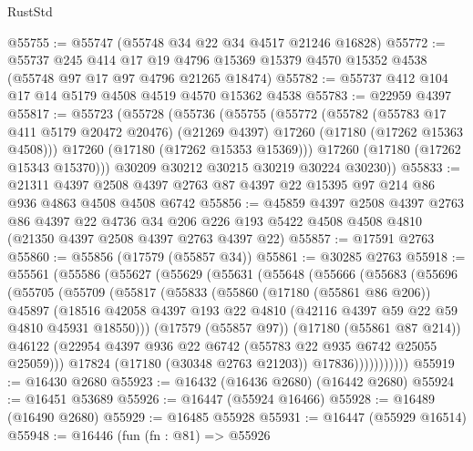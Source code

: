 \begin{lexlean}{RustStd}
\begin{coremodule}
{\begin{coremodule}
{{{{{{{{{{{{{{{{{{{{{{{{{{{{{{{{{{{{{{{{{{{{{{{{{{{{{{{@55755 := @55747 (@55748 @34 @22 @34 @4517 @21246 @16828)
@55772 := @55737
    @245
    @414
    @17
    @19
    @4796
    @15369
    @15379
    @4570
    @15352
    @4538
    (@55748 @97 @17 @97 @4796 @21265 @18474)
@55782 := @55737 @412 @104 @17 @14 @5179 @4508 @4519 @4570 @15362 @4538
@55783 := @22959 @4397
@55817 := @55723
    (@55728
      (@55736
        (@55755
          (@55772
            (@55782
              (@55783 @17 @411 @5179 @20472 @20476)
              (@21269 @4397)
              @17260
              (@17180 (@17262 @15363 @4508)))
            @17260
            (@17180 (@17262 @15353 @15369)))
          @17260
          (@17180 (@17262 @15343 @15370)))
        @30209
        @30212
        @30215
        @30219
        @30224
        @30230))
@55833 := @21311
    @4397
    @2508
    @4397
    @2763
    @87
    @4397
    @22
    @15395
    @97
    @214
    @86
    @936
    @4863
    @4508
    @4508
    @6742
@55856 := @45859
    @4397
    @2508
    @4397
    @2763
    @86
    @4397
    @22
    @4736
    @34
    @206
    @226
    @193
    @5422
    @4508
    @4508
    @4810
    (@21350 @4397 @2508 @4397 @2763 @4397 @22)
@55857 := @17591 @2763
@55860 := @55856 (@17579 (@55857 @34))
@55861 := @30285 @2763
@55918 := @55561
    (@55586
      (@55627
        (@55629
          (@55631
            (@55648
              (@55666
                (@55683
                  (@55696
                    (@55705
                      (@55709
                        (@55817
                          (@55833
                            (@55860
                              (@17180 (@55861 @86 @206))
                              @45897
                              (@18516
                                @42058
                                @4397
                                @193
                                @22
                                @4810
                                (@42116 @4397 @59 @22 @59 @4810 @45931 @18550)))
                            (@17579 (@55857 @97))
                            (@17180 (@55861 @87 @214))
                            @46122
                            (@22954 @4397 @936 @22 @6742 (@55783 @22 @935 @6742 @25055 @25059)))
                          @17824
                          (@17180 (@30348 @2763 @21203))
                          @17836)))))))))))
@55919 := @16430 @2680
@55923 := @16432 (@16436 @2680) (@16442 @2680)
@55924 := @16451 @53689
@55926 := @16447 (@55924 @16466)
@55928 := @16489 (@16490 @2680)
@55929 := @16485 @55928
@55931 := @16447 (@55929 @16514)
@55948 := @16446
    (fun (fn : @81) =>
    @55926
}}}}}}}}}}}}}}}}}}}}}}}}}}}}}}}}}}}}}}}}}}}}}}}}}}}}}}}
\end{coremodule}}
\end{coremodule}
\end{lexlean}

